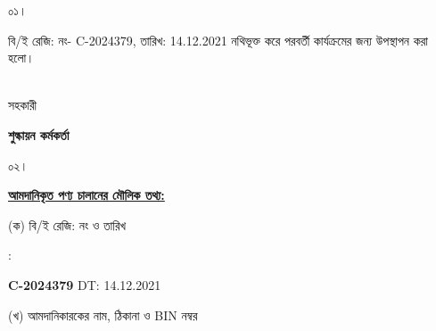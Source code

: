 \documentclass[12pt]{article}
\newcommand{\beno}{C-2024379}
\newcommand{\bedt}{14.12.2021}
\begin{document}
\noindent
\begin{minipage}[t]{0.05\linewidth}
০১।
\end{minipage}
\begin{minipage}[t]{0.95\linewidth}
বি/ই রেজি: নং- {\beno}, তারিখ: {\bedt}
নথিভূক্ত করে পরবর্তী কার্যক্রমের জন্য উপস্থাপন করা হলো।
\\
\\
\end{minipage}
\begin{minipage}[t]{0.05\linewidth}
\hspace*{0em}
\end{minipage}
\begin{minipage}[t]{0.05\linewidth}
সহকারী
\end{minipage}
\begin{minipage}[t]{0.37\linewidth}
\hspace{0em}
\end{minipage}
\begin{minipage}[t]{0.53\linewidth}
\textbf{শুল্কায়ন কর্মকর্তা}
\\
\end{minipage}
\begin{minipage}[t]{0.05\linewidth}
০২।
\end{minipage}
\begin{minipage}[t]{0.95\linewidth}
\underline{\textbf {আমদানিকৃত পণ্য চালানের
মৌলিক তথ্য:}}
\\
\end{minipage}
\footnotesize
\begin{minipage}[t]{0.05\linewidth}
\hspace*{1em}
\end{minipage}
\begin{minipage}[t]{0.40\linewidth}
(ক) বি/ই রেজি: নং ও তারিখ
\end{minipage}
\begin{minipage}[t]{0.02\linewidth}
:
\end{minipage}
\begin{minipage}[t]{0.53\linewidth}
\textbf{{\beno}} \hspace{2em} DT: {\bedt}
\\
\end{minipage}
\begin{minipage}[t]{0.05\linewidth}
\hspace*{1em}
\end{minipage}
\begin{minipage}[t]{0.40\linewidth}
(খ) আমদানিকারকের নাম, ঠিকানা
ও BIN নম্বর
\end{minipage}
\end{document}
